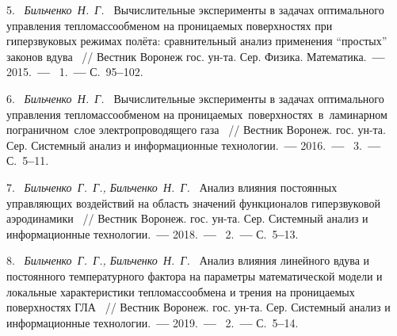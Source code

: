 5.~%
\textit%
{Бильченко~Н.~Г.~}
{%
	{Вычислительные
	эксперименты
	в
	задачах
	оптимального
	управления
	тепломассообменом
	на  проницаемых  поверхностях
	при  гиперзвуковых
	режимах
	полёта:    сравнительный
	анализ  применения
	``простых''  законов  вдува}%
~/$\!$/
   Вестник  Воронеж  гос.  ун-та.
	Сер.  Физика.  Математика.~{\textbf{---}}
	2015.~{\textbf{---}}
	\No~1.~{\textbf{---}}
	С.~95{\textbf{--}}102.%
	}



6.~%
\textit%
{Бильченко~Н.~Г.~}
{%
  {Вычислительные
   эксперименты
   в
   задачах
   оптимального
   управления  тепломассообменом
   на
   проницаемых\,  поверхностях\,
   в\,  ламинарном\,   пограничном\,
   слое
   электропроводящего  газа}%
~/$\!$/
  Вестник  Воронеж.  гос.  ун-та.
  Сер.  Системный  анализ
  и  информационные  технологии.~{\textbf{---}}
  2016.~{\textbf{---}}
  \No~3.~{\textbf{---}}
  С.~5{\textbf{--}}11.%
  }



7.~%
\textit%
{Бильченко~Г.~Г.,
 Бильченко~Н.~Г.~}
{%
  {Анализ  влияния
  постоянных
  управляющих
  воздействий
  на
  область
  значений
  функционалов
  гиперзвуковой
  аэродинамики}%
~/$\!$/
  Вестник  Воронеж.  гос.  ун-та.
  Сер.  Системный  анализ
  и  информационные  технологии.~{\textbf{---}}
  2018.~{\textbf{---}}
  \No~2.~{\textbf{---}}
  С.~5{\textbf{--}}13.%
  }



8.~%
\textit%
{Бильченко~Г.~Г.,
 Бильченко~Н.~Г.~}
{%
  {Анализ  влияния
линейного  вдува
и  постоянного  температурного  фактора
на  параметры  математической  модели
и
локальные  характеристики  тепломассообмена
и  трения
на  проницаемых  поверхностях  ГЛА}%
~/$\!$/
  Вестник  Воронеж.  гос.  ун-та.
  Сер.  Системный  анализ
  и  информационные  технологии.~{\textbf{---}}
  2019.~{\textbf{---}}
  \No~2.~{\textbf{---}}
  С.~5{\textbf{--}}14.%
  }



